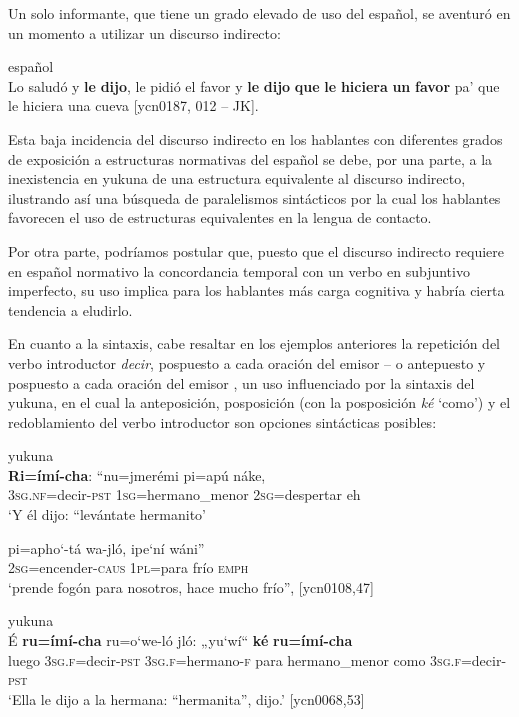 \documentclass[output=paper]{langscibook}
\begin{document}
Un solo informante, que tiene un grado elevado de uso del español, se aventuró en un momento a utilizar un discurso indirecto:

\ea
{español}\\
Lo saludó y \textbf{le} \textbf{dijo}, le pidió el favor y \textbf{le} \textbf{dijo} \textbf{que} \textbf{le} \textbf{hiciera} \textbf{un} \textbf{favor} pa’ que le hiciera una cueva {[ycn0187, 012 – JK].} \\
\z

Esta baja incidencia del discurso indirecto en los hablantes con diferentes grados de exposición a estructuras normativas del español se debe, por una parte, a la inexistencia en yukuna de una estructura equivalente al discurso indirecto, ilustrando así una búsqueda de paralelismos sintácticos por la cual los hablantes favorecen el uso de estructuras equivalentes en la lengua de contacto. 

Por otra parte, podríamos postular que, puesto que el discurso indirecto requiere en español normativo la concordancia temporal con un verbo en subjuntivo imperfecto, su uso implica para los hablantes más carga cognitiva y habría cierta tendencia a eludirlo.   

En cuanto a la sintaxis, cabe resaltar en los ejemplos anteriores la repetición del verbo introductor \textit{decir}, pospuesto a cada oración del emisor -- o antepuesto y pospuesto a cada oración del emisor , un uso influenciado por la sintaxis del yukuna, en el cual la anteposición, posposición (con la posposición \textit{ké} ‘como’) y el redoblamiento del verbo introductor son opciones sintácticas posibles:

\newpage
\ea\label{ex:lemus:39}
{yukuna}\\
\gll \textbf{Ri=ímí-cha}: “nu=jmerémi pi=apú náke,\\
     \textsc{3sg.nf=}decir-\textsc{pst} \textsc{1sg}=hermano\_menor \textsc{2sg=}despertar eh\\
\glt `Y él dijo: “levántate hermanito'

\gll pi=apho‘-tá     wa-jló,   ipe‘ní wáni”\\
     \textsc{2sg}=encender\nobreakdash-\textsc{caus}  \textsc{1pl=}para  frío \textsc{emph}\\
\glt `prende fogón para nosotros, hace mucho frío”,  [ycn0108,47]
\z

\ea\label{ex:lemus:40}
{yukuna}\\
\gll É \textbf{ru=ímí-cha} ru=o‘we-ló  jló: „yu‘wí“ \textbf{ké} \textbf{ru=ímí-cha} \\
     luego \textsc{3sg.f}=decir-\textsc{pst}  \textsc{3sg.f}=hermano-\textsc{f} para hermano\_menor como \textsc{3sg.f}=decir-\textsc{pst}\\
\glt `Ella le dijo a la hermana: “hermanita”, dijo.’ [ycn0068,53]
\z
\end{document}
